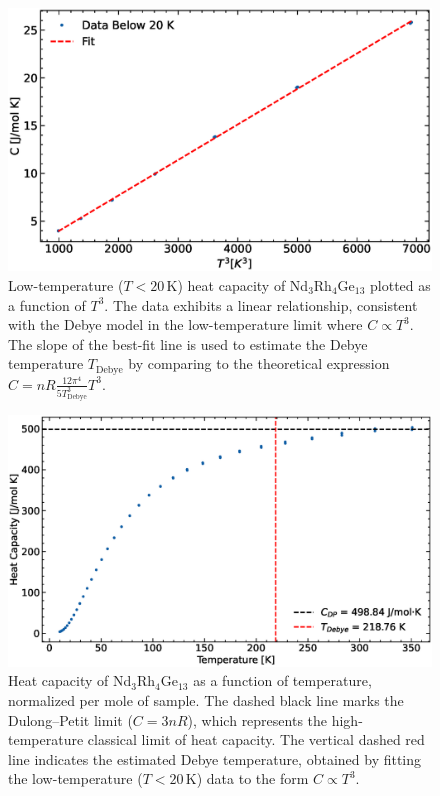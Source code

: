 \begin{enumerate}
    \begin{figure}[ht]
    \centering
    \includegraphics[width=\linewidth]{Images/HW1_c_fit_Debye.eps}
    \caption{Low-temperature ($T < 20\,\mathrm{K}$) heat capacity of Nd$_3$Rh$_4$Ge$_{13}$ plotted as a function of $T^3$. The data exhibits a linear relationship, consistent with the Debye model in the low-temperature limit where $C \propto T^3$. The slope of the best-fit line is used to estimate the Debye temperature $T_{\mathrm{Debye}}$ by comparing to the theoretical expression $C = nR \frac{12\pi^4}{5 T_{\text{Debye}}^3} T^3$.}
    \label{fig:debye_fit}
    \end{figure}

    \begin{figure}[ht]
    \centering
    \includegraphics[width= \linewidth]{Images/HW1_c_Debye_Annotated.eps}
    \caption{Heat capacity of Nd$_3$Rh$_4$Ge$_{13}$ as a function of temperature, normalized per mole of sample. The dashed black line marks the Dulong--Petit limit ($C = 3nR$), which represents the high-temperature classical limit of heat capacity. The vertical dashed red line indicates the estimated Debye temperature, obtained by fitting the low-temperature ($T < 20\,\mathrm{K}$) data to the form $C \propto T^3$.}
    \label{fig:debye_annotated}
    \end{figure}



\end{enumerate}
